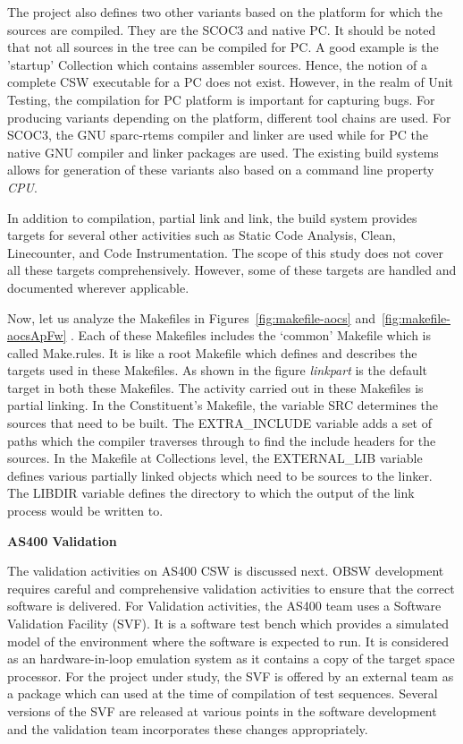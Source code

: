 \documentclass[12pt, a4paper, titlepage]{scrartcl}
\newcommand{\courierword}[1]{\textsf{\itshape #1}}{\fontfamily{pcr}\selectfont}%
\begin{document}
\par The project also defines two other variants based on the platform for which the sources are compiled. They are the SCOC3\cite{koebel2010scoc3} and native PC. It should be noted that not all sources in the tree can be compiled for PC. A good example is the 'startup' Collection which contains assembler sources. Hence, the notion of a complete CSW executable for a PC does not exist. However, in the realm of Unit Testing, the compilation for PC platform is  important for capturing bugs. For producing variants depending on the platform, different tool chains are used. For SCOC3, the GNU sparc-rtems compiler and linker are used while for PC the native GNU compiler and linker packages are used. The existing build systems allows for generation of these variants also based on a command line property \courierword{CPU}.
\par In addition to compilation, partial link and link, the build system provides targets for several other activities such as Static Code Analysis, Clean, Linecounter, and Code Instrumentation. The scope of this study does not cover all these targets comprehensively. However, some of these targets are handled and documented wherever applicable. 
\par Now, let us analyze the Makefiles in Figures~\ref{fig:makefile-aocs} and~\ref{fig:makefile-aocsApFw} . Each of these Makefiles includes the ‘common’ Makefile which is called Make.rules. It is like a root Makefile which defines and describes the targets used in these Makefiles. As shown in the figure \courierword{linkpart} is the default target in both these Makefiles. The activity carried out in these Makefiles is partial linking. In the Constituent's Makefile, the variable SRC determines the sources that need to be built. The EXTRA\_INCLUDE variable adds a set of paths which the compiler traverses through to find the include headers for the sources. In the Makefile at Collections level, the EXTERNAL\_LIB variable defines various partially linked objects which need to be sources to the linker. The LIBDIR variable defines the directory to which the output of the link process would be written to.
\linebreak
\par \textbf{AS400 Validation}
\par The validation activities on AS400 CSW is discussed next. OBSW development requires careful and comprehensive validation activities to ensure that the correct software is delivered. For Validation activities, the AS400 team uses a Software Validation Facility (SVF)\cite{hjortnaes1997software}. It is a software test bench which provides a simulated model of the environment where the software is expected to run. It is considered as an hardware-in-loop emulation system as it contains a copy of the target space processor. For the project under study, the SVF is offered by an external team as a package which can used at the time of compilation of test sequences. Several versions of the SVF are released at various points in the software development and the validation team incorporates these changes appropriately. 
\end{document}
